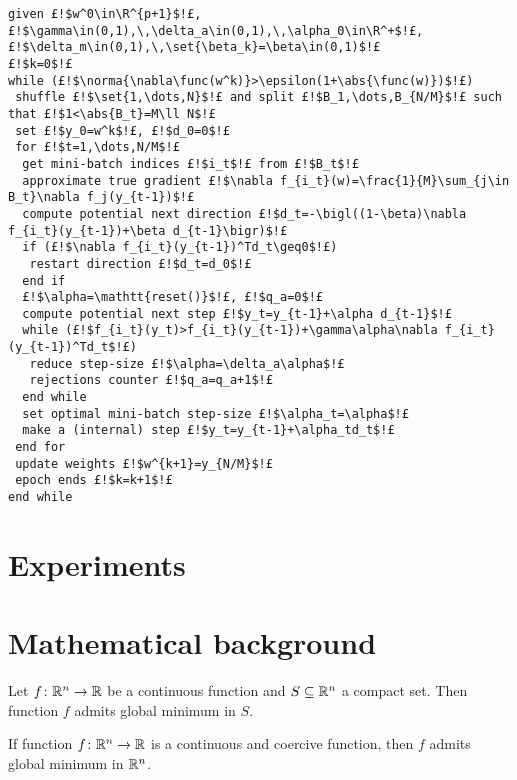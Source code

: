 \cleardoublepage
\begin{lstlisting}[style=simple,caption={Mini-batch Gradient Descent with Armijo line search for step-size and Momentum restart}]
given £!$w^0\in\R^{p+1}$!£, £!$\gamma\in(0,1),\,\delta_a\in(0,1),\,\alpha_0\in\R^+$!£, £!$\delta_m\in(0,1),\,\set{\beta_k}=\beta\in(0,1)$!£
£!$k=0$!£
while (£!$\norma{\nabla\func(w^k)}>\epsilon(1+\abs{\func(w)})$!£)
 shuffle £!$\set{1,\dots,N}$!£ and split £!$B_1,\dots,B_{N/M}$!£ such that £!$1<\abs{B_t}=M\ll N$!£
 set £!$y_0=w^k$!£, £!$d_0=0$!£
 for £!$t=1,\dots,N/M$!£
  get mini-batch indices £!$i_t$!£ from £!$B_t$!£
  approximate true gradient £!$\nabla f_{i_t}(w)=\frac{1}{M}\sum_{j\in B_t}\nabla f_j(y_{t-1})$!£
  compute potential next direction £!$d_t=-\bigl((1-\beta)\nabla f_{i_t}(y_{t-1})+\beta d_{t-1}\bigr)$!£
  if (£!$\nabla f_{i_t}(y_{t-1})^Td_t\geq0$!£)
   restart direction £!$d_t=d_0$!£
  end if
  £!$\alpha=\mathtt{reset()}$!£, £!$q_a=0$!£
  compute potential next step £!$y_t=y_{t-1}+\alpha d_{t-1}$!£
  while (£!$f_{i_t}(y_t)>f_{i_t}(y_{t-1})+\gamma\alpha\nabla f_{i_t}(y_{t-1})^Td_t$!£)
   reduce step-size £!$\alpha=\delta_a\alpha$!£
   rejections counter £!$q_a=q_a+1$!£
  end while
  set optimal mini-batch step-size £!$\alpha_t=\alpha$!£
  make a (internal) step £!$y_t=y_{t-1}+\alpha_td_t$!£
 end for
 update weights £!$w^{k+1}=y_{N/M}$!£
 epoch ends £!$k=k+1$!£
end while
\end{lstlisting}


\section{Experiments}

\cleardoublepage
\section{Mathematical background}

\begin{thm}\label{thm:weirs}
Let $f\colon\mathbb{R}^n\to\mathbb{R}$ be a continuous function and $S\subseteq\mathbb{R}^n$ a compact set. Then function $f$ admits global minimum in $S$.
\end{thm}

\begin{cor}
If function $f\colon\mathbb{R}^n\to\mathbb{R}$ is a continuous and coercive function, then $f$ admits global minimum in $\mathbb{R}^n$.
\end{cor}

